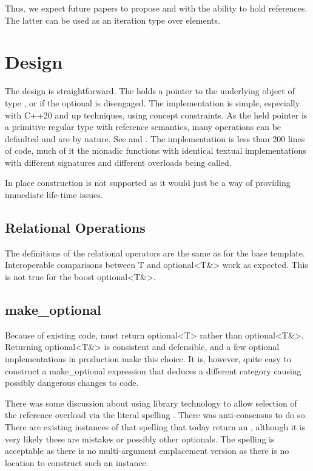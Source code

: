 \documentclass[a4paper,10pt,oneside,openany,final,article]{memoir}
\begin{document}
Thus, we expect future papers to propose  and  with the ability to hold references.
The latter can be used as an iteration type over  elements.


\chapter{Design}

The design is straightforward. The  holds a pointer to the underlying object of type , or  if the optional is disengaged. The implementation is simple, especially with C++20 and up techniques, using concept constraints. As the held pointer is a primitive regular type with reference semantics, many operations can be defaulted and are  by nature. See \cite{Downey_smd_optional_optional_T} and \cite{rawgithu58:online}. The  implementation is less than 200 lines of code, much of it the monadic functions with identical textual implementations with different signatures and different overloads being called.

In place construction is not supported as it would just be a way of providing immediate life-time issues.

\section{Relational Operations}

The definitions of the relational operators are the same as for the base template. Interoperable comparisons between T and optional<T\&> work as expected. This is not true for the boost optional<T\&>.

\section{make_optional}
Because of existing code,  must return optional<T> rather than optional<T\&>. Returning optional<T\&> is consistent and defensible, and a few optional implementations in production make this choice. It is, however, quite easy to construct a make_optional expression that deduces a different category causing possibly dangerous changes to code.

There was some discussion about using library technology to allow selection of the reference overload via the literal spelling . There was anti-consensus to do so. There are existing instances of that spelling that today return an , although it is very likely these are mistakes or possibly other optionals. The spelling  is acceptable as there is no multi-argument emplacement version as there is no location to construct such an instance.
\end{document}
